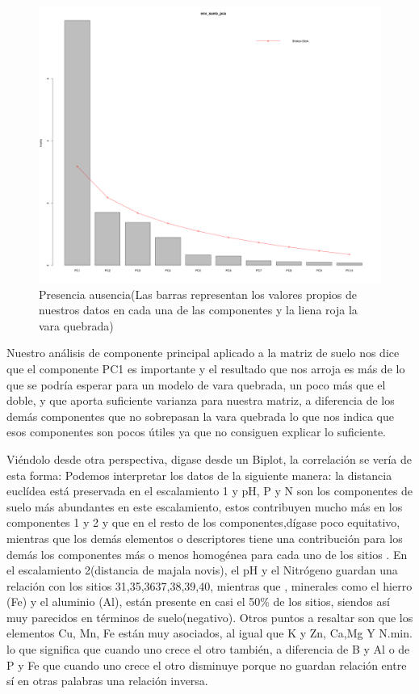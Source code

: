 \documentclass[11pt,]{article}
\begin{document}
\begin{figure}
\centering
\includegraphics{PCA_1.png}
\caption{\label{fig:PCA_1}Presencia ausencia(Las barras representan los
valores propios de nuestros datos en cada una de las componentes y la
liena roja la vara quebrada)}
\end{figure}

Nuestro análisis de componente principal aplicado a la matriz de suelo
nos dice que el componente PC1 es importante y el resultado que nos
arroja es más de lo que se podría esperar para un modelo de vara
quebrada, un poco más que el doble, y que aporta suficiente varianza
para nuestra matriz, a diferencia de los demás componentes que no
sobrepasan la vara quebrada lo que nos indica que esos componentes son
pocos útiles ya que no consiguen explicar lo suficiente.

Viéndolo desde otra perspectiva, digase desde un Biplot, la correlación
se vería de esta forma: Podemos interpretar los datos de la siguiente
manera: la distancia euclídea está preservada en el escalamiento 1 y pH,
P y N son los componentes de suelo más abundantes en este escalamiento,
estos contribuyen mucho más en los componentes 1 y 2 y que en el resto
de los componentes,dígase poco equitativo, mientras que los demás
elementos o descriptores tiene una contribución para los demás los
componentes más o menos homogénea para cada uno de los sitios . En el
escalamiento 2(distancia de majala novis), el pH y el Nitrógeno guardan
una relación con los sitios 31,35,3637,38,39,40, mientras que ,
minerales como el hierro (Fe) y el aluminio (Al), están presente en casi
el 50\% de los sitios, siendos así muy parecidos en términos de
suelo(negativo). Otros puntos a resaltar son que los elementos Cu, Mn,
Fe están muy asociados, al igual que K y Zn, Ca,Mg Y N.min. lo que
significa que cuando uno crece el otro también, a diferencia de B y Al o
de P y Fe que cuando uno crece el otro disminuye porque no guardan
relación entre sí en otras palabras una relación inversa.
\end{document}
